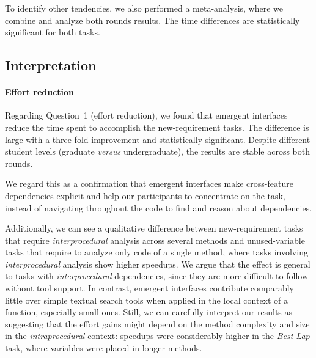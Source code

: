
To identify other tendencies, we also performed a meta-analysis, where we combine and analyze both rounds results. The time differences are statistically significant for both tasks.

\subsection{Interpretation}

\paragraph{Effort reduction}
Regarding Question~1 (effort reduction), we found that emergent interfaces reduce the time spent to accomplish the new-requirement tasks. The difference is large with a three-fold improvement and statistically significant. Despite different student levels (graduate \textit{versus} undergraduate), the results are stable across both rounds.

We regard this as a confirmation that emergent interfaces make cross-feature dependencies explicit and help our participants to concentrate on the task, instead of navigating throughout the code to find and reason about dependencies. 

Additionally, we can see a qualitative difference between new-requirement tasks that require \textit{interprocedural} analysis across several methods and unused-variable tasks that require to analyze only code of a single method, where tasks involving \textit{interprocedural} analysis show higher speedups.
We argue that the effect is general to tasks with \textit{interprocedural} dependencies, since they are more difficult to follow without tool support. In contrast, emergent interfaces contribute comparably little over simple textual search tools when applied in the local context of a function, especially small ones. %
Still, we can carefully interpret our results as suggesting that the effort gains might depend on the method complexity and size in the \textit{intraprocedural} context: speedups were considerably higher in the \textit{Best Lap} task, where variables were placed in longer methods. %


